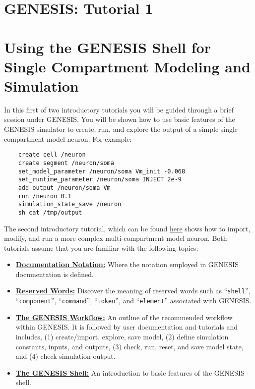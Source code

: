 \documentclass[12pt]{article}
\begin{document}
\section*{GENESIS: Tutorial 1}

\section*{Using the GENESIS Shell for\\Single Compartment Modeling and Simulation}

In this first of two introductory tutorials you will be guided through a brief session under GENESIS. You will be shown how to use basic features of the GENESIS simulator to create, run, and explore the output of a simple single compartment model neuron. For example:

\begin{verbatim}
    create cell /neuron
    create segment /neuron/soma
    set_model_parameter /neuron/soma Vm_init -0.068
    set_runtime_parameter /neuron/soma INJECT 2e-9
    add_output /neuron/soma Vm
    run /neuron 0.1
    simulation_state_save /neuron
    sh cat /tmp/output
\end{verbatim}
The second introductory tutorial, which can be found \href{../tutorial2/tutorial2.pdf}{here} shows how to import, modify, and run a more complex multi-compartment model neuron. Both tutorials assume that you are familiar with the following topics:

\begin{itemize}

\item \href{../introduction-notation/introduction-notation.pdf}{\bf Documentation Notation:} Where the notation employed in GENESIS documentation is defined.

\item \href{../introduction-reserved-words/introduction-reserved-words.pdf}{\bf Reserved Words:} Discover the meaning of reserved words such as ``{\tt shell}'', ``{\tt component}'', ``{\tt command}'', ``{\tt token}'', and ``{\tt element}'' associated with GENESIS.

\item \href{../introduction-work-flow/introduction-work-flow.pdf}{\bf The GENESIS Workflow:} An outline of the recommended workflow within GENESIS. It is followed by user documentation and tutorials and includes, (1) create/import, explore, save model, (2) define simulation constants, inputs, and outputs, (3) check, run, reset, and save model state, and (4) check simulation output.  

\item \href{../introduction-gshell/introduction-gshell.pdf}{\bf The GENESIS Shell:} An introduction to basic features of the GENESIS shell.

\end{itemize}
\end{document}
